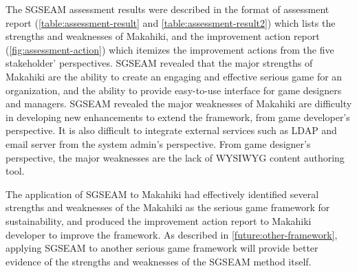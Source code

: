 The SGSEAM assessment results were described in the format of assessment report (\autoref{table:assessment-result} and \autoref{table:assessment-result2}) which lists the strengths and weaknesses of Makahiki, and the improvement action report (\autoref{fig:assessment-action}) which itemizes the improvement actions from the five stakeholder' perspectives.   SGSEAM revealed that the major strengths of Makahiki are the ability to create an engaging and effective serious game for an organization, and the ability to provide easy-to-use interface for game designers and managers. SGSEAM revealed the major weaknesses of Makahiki are difficulty in developing new enhancements to extend the framework, from game developer's perspective. It is also difficult to integrate external services such as LDAP and email server from the system admin's perspective. From game designer's perspective, the major weaknesses are the lack of WYSIWYG content authoring tool.

The application of SGSEAM to Makahiki had effectively identified several strengths and weaknesses of the Makahiki as the serious game framework for sustainability, and produced the improvement action report to Makahiki developer to improve the framework. As described in \autoref{future:other-framework}, applying SGSEAM to another serious game framework will provide better evidence of the strengths and weaknesses of the SGSEAM method itself. 
